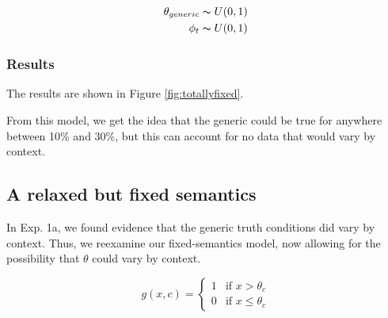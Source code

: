 \documentclass[10pt,letterpaper]{article}
\newcommand{\red}[1]{\textcolor{Red}{#1}}
\begin{document}
\begin{align}
\theta_{generic} \thicksim U(0,1) \\
\phi_{t} \thicksim U(0,1) %
\end{align}

%

%
%	
%		
%			

\subsubsection{Results}

The results are shown in Figure \ref{fig:totallyfixed}. 


From this model, we get the idea that the generic could be true for anywhere between 10\% and 30\%, but this can account for no data that would vary by context.

\subsection{A relaxed but fixed semantics}

 In Exp. 1a, we found evidence that the generic truth conditions did vary by context. Thus, we reexamine our fixed-semantics model, now allowing for the possibility that $\theta$ could vary by context.


\[
 g(x, c) =
  \begin{cases}
   1 & \text{if } x > \theta_{c} \\
   0       & \text{if } x \leq \theta_{c}
  \end{cases}
\]
\end{document}
